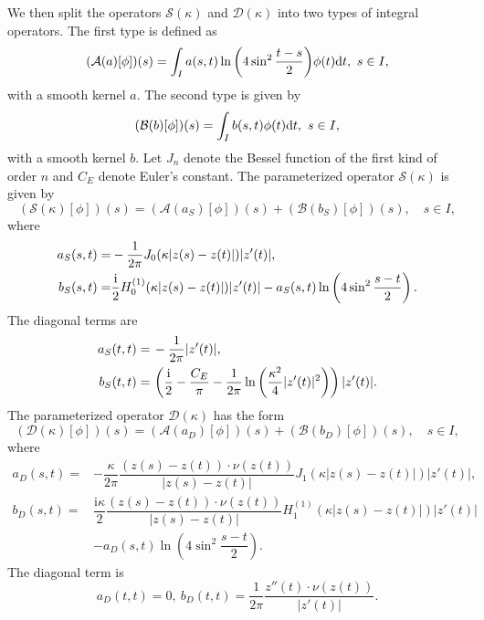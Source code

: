 \documentclass{article}
\begin{document}
	
	We then split the operators  $\mathcal{S}(\kappa)$ and $\mathcal{D}(\kappa)$ into two types of integral operators. The first type is defined as
	\begin{equation*}\label{Aphi}
		(\mathcal{A}(a)[\phi])(s)=\int_{I}a(s,t)\ln{\left(4\sin^2{\dfrac{t-s}{2}}\right)}\phi(t){\rm d}t,~s\in I,
	\end{equation*}
	with a smooth kernel $a$. The second type is given by
	\begin{equation*}\label{Bphi}
		(\mathcal{B}(b)[\phi])(s)=\int_{I}b(s,t)\phi(t){\rm d}t,~s\in I,
	\end{equation*}
	with a smooth kernel $b$. Let $J_n$ denote the Bessel function of the first kind of order $n$ and $C_E$ denote Euler's constant. The parameterized operator $\mathcal{S}(\kappa)$ is given by
	\begin{equation*}
		(\mathcal{S}(\kappa)[\phi])(s)=(\mathcal{A}(a_S)[\phi])(s)+(\mathcal{B}(b_S)[\phi])(s), \quad  s\in I,
	\end{equation*}
	where
	\begin{align*}
		a_S(s, t)= & -\dfrac{1}{2\pi}J_0(\kappa|z(s)-z(t)|)|z'(t)|,\\
		b_S(s, t)= &\dfrac{\rm i}{2}H_0^{(1)}(\kappa|z(s)-z(t)|)|z'(t)|-a_S(s, t)\ln\left(4\sin^2\dfrac{s-t}{2}\right).
	\end{align*}
	The diagonal terms are 
	\begin{align*}
		a_S(t, t)= &\, -\dfrac{1}{2\pi}|z'(t)|, \\
		b_S(t, t)= &\,\left(\dfrac{\rm i}{2}-\dfrac{C_E}{\pi}-\dfrac{1}{2\pi}\ln{\left(\dfrac{\kappa^2}{4}|z'(t)|^2\right)} \right)|z'(t)|.
	\end{align*}
	The parameterized operator $\mathcal{D}(\kappa)$ has the form
	\begin{equation*}
		(\mathcal{D}(\kappa)[\phi])(s)=(\mathcal{A}(a_D)[\phi])(s)+(\mathcal{B}(b_D)[\phi])(s), \quad s\in I,
	\end{equation*}
	where 
	\begin{align*}
		a_D(s, t) =&- \dfrac{\kappa}{2\pi}\dfrac{(z(s)-z(t))\cdot\nu(z(t))}{|z(s)-z(t)|}J_1(\kappa|z(s)-z(t)|)|z'(t)|,\\
		b_D(s, t)  =&\dfrac{\mathrm{i}\kappa}{2}\dfrac{(z(s)-z(t))\cdot\nu(z(t))}{|z(s)-z(t)|}H_1^{(1)}(\kappa|z(s)-z(t)|)|z'(t)|\\
		&-a_D(s, t)\ln\left(4\sin^2\dfrac{s-t}{2}\right).
	\end{align*}
	The diagonal term is
	\begin{equation*}
		a_D(t, t)=0,~
		b_D(t, t)=\dfrac{1}{2\pi}\dfrac{z''(t)\cdot\nu(z(t))}{|z'(t)|}.
	\end{equation*}
	
\end{document}
